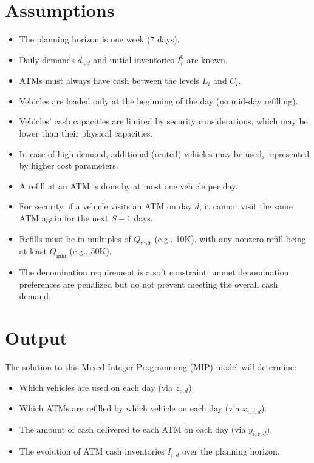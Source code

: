 \documentclass[11pt]{article}
\begin{document}
\section{Assumptions}
\begin{itemize}[leftmargin=1.5cm]
    \item The planning horizon is one week (\(7\) days).
    \item Daily demands \(d_{i,d}\) and initial inventories \(I_i^0\) are known.
    \item ATMs must always have cash between the levels \(L_i\) and \(C_i\).
    \item Vehicles are loaded only at the beginning of the day (no mid-day refilling).
    \item Vehicles' cash capacities are limited by security considerations, which may be lower than their physical capacities.
    \item In case of high demand, additional (rented) vehicles may be used, represented by higher cost parameters.
    \item A refill at an ATM is done by at most one vehicle per day.
    \item For security, if a vehicle visits an ATM on day \(d\), it cannot visit the same ATM again for the next \(S-1\) days.
    \item Refills must be in multiples of \(Q_{\text{unit}}\) (e.g., 10K), with any nonzero refill being at least \(Q_{\min}\) (e.g., 50K).
    \item The denomination requirement is a soft constraint; unmet denomination preferences are penalized but do not prevent meeting the overall cash demand.
\end{itemize}

\section{Output}
The solution to this Mixed-Integer Programming (MIP) model will determine:
\begin{itemize}[leftmargin=1.5cm]
    \item Which vehicles are used on each day (via \(z_{v,d}\)).
    \item Which ATMs are refilled by which vehicle on each day (via \(x_{i,v,d}\)).
    \item The amount of cash delivered to each ATM on each day (via \(y_{i,v,d}\)).
    \item The evolution of ATM cash inventories \(I_{i,d}\) over the planning horizon.
\end{itemize}
\end{document}
